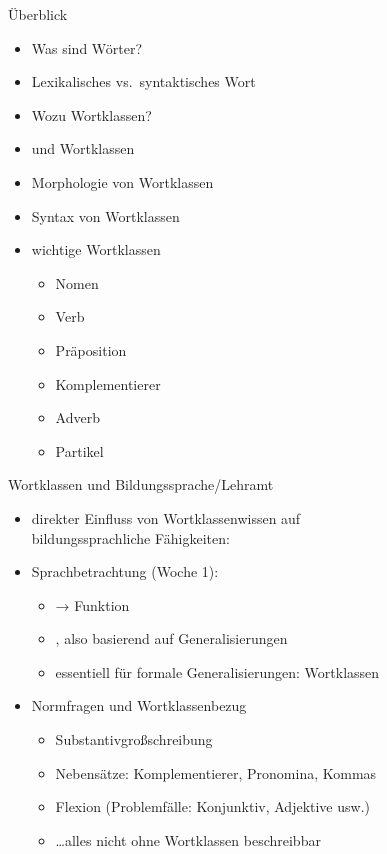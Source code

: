 \begin{frame}
  {Überblick}
  \pause
  \begin{itemize}[<+->]
    \item Was sind Wörter?
    \item Lexikalisches vs.\ syntaktisches Wort
      \Zeile
    \item Wozu Wortklassen?
    \item {} und Wortklassen
    \item \alert{Morphologie} von Wortklassen
    \item \alert{Syntax} von Wortklassen
      \Zeile
    \item wichtige Wortklassen
      \begin{itemize}[<+->]
        \item Nomen
        \item Verb
        \item Präposition
        \item Komplementierer
        \item Adverb
        \item Partikel
      \end{itemize}
  \end{itemize}
\end{frame}

\begin{frame}
  {Wortklassen und Bildungssprache\slash Lehramt}
  \pause
  \begin{itemize}[<+->]
    \item direkter Einfluss von Wortklassenwissen auf\\
      bildungssprachliche Fähigkeiten: 
      \Zeile
    \item Sprachbetrachtung (Woche 1):
      \begin{itemize}[<+->]
        \item {} → \alert{Funktion}
        \item {}, also basierend auf \alert{Generalisierungen}
        \item essentiell für formale Generalisierungen: \alert{Wortklassen}
      \end{itemize}
      \Zeile
    \item Normfragen und Wortklassenbezug
      \begin{itemize}
        \item \alert{Substantivgroßschreibung}
        \item Nebensätze: Komplementierer, Pronomina, Kommas
        \item Flexion (Problemfälle: Konjunktiv, Adjektive usw.)
        \item \dots alles nicht ohne Wortklassen beschreibbar
      \end{itemize}
  \end{itemize}
\end{frame}

